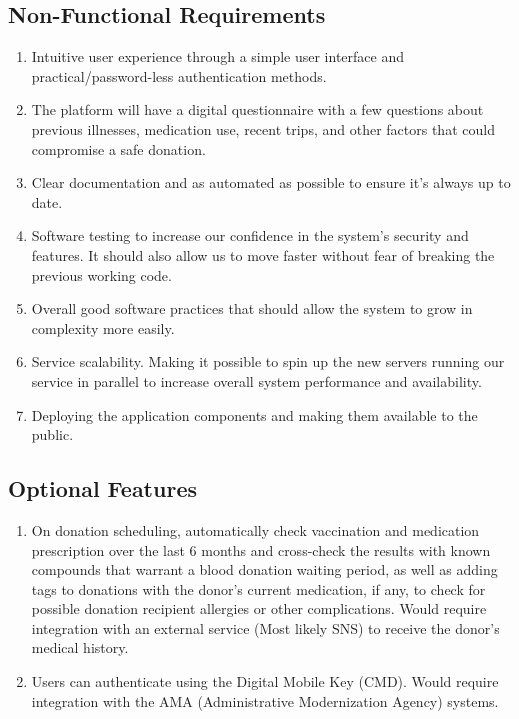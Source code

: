 \documentclass[a4paper,twoside,11pt]{article}
\begin{document}
\subsection{Non-Functional Requirements}
\begin{enumerate}
	\item Intuitive user experience through a simple user interface and practical/password-less authentication methods.
	\item The platform will have a digital questionnaire with a few questions about previous illnesses, medication use, recent trips, and other factors that could compromise a safe donation.
	\item Clear documentation and as automated as possible to ensure it's always up to date.
	\item Software testing to increase our confidence in the system’s security and features. It should also allow us to move faster without fear of breaking the previous working code.
	\item Overall good software practices that should allow the system to grow in complexity more easily.
	\item Service scalability. Making it possible to spin up the new servers running our service in parallel to increase overall system performance and availability.
	\item Deploying the application components and making them available to the public.
\end{enumerate}

\subsection{Optional Features}
\begin{enumerate}
	\item On donation scheduling, automatically check vaccination and medication prescription over the last 6 months and cross-check the results with known compounds that warrant a blood donation waiting period, as well as adding tags to donations with the donor's current medication, if any, to check for possible donation recipient allergies or other complications. Would require integration with an external service (Most likely SNS) to receive the donor’s medical history.
	\item Users can authenticate using the Digital Mobile Key (CMD). Would require integration with the AMA (Administrative Modernization Agency) systems.
\end{enumerate}
\end{document}
